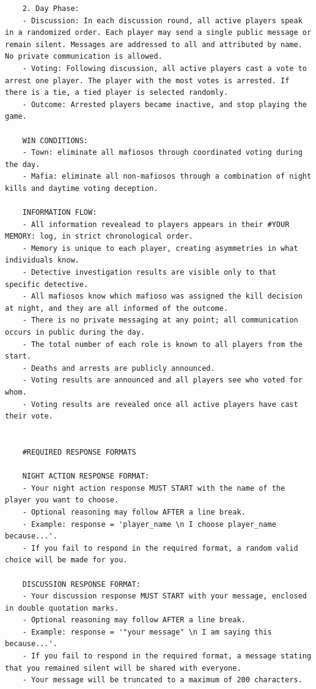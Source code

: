 \documentclass{article}
\begin{document}
\begin{small}
\begin{verbatim}
    2. Day Phase:
    - Discussion: In each discussion round, all active players speak in a randomized order. Each player may send a single public message or remain silent. Messages are addressed to all and attributed by name. No private communication is allowed.
    - Voting: Following discussion, all active players cast a vote to arrest one player. The player with the most votes is arrested. If there is a tie, a tied player is selected randomly.
    - Outcome: Arrested players became inactive, and stop playing the game.
    
    WIN CONDITIONS:
    - Town: eliminate all mafiosos through coordinated voting during the day.
    - Mafia: eliminate all non-mafiosos through a combination of night kills and daytime voting deception.
    
    INFORMATION FLOW:
    - All information revealead to players appears in their #YOUR MEMORY: log, in strict chronological order.
    - Memory is unique to each player, creating asymmetries in what individuals know.
    - Detective investigation results are visible only to that specific detective.
    - All mafiosos know which mafioso was assigned the kill decision at night, and they are all informed of the outcome.
    - There is no private messaging at any point; all communication occurs in public during the day.
    - The total number of each role is known to all players from the start.
    - Deaths and arrests are publicly announced.
    - Voting results are announced and all players see who voted for whom.
    - Voting results are revealed once all active players have cast their vote.
    
    
    #REQUIRED RESPONSE FORMATS
    
    NIGHT ACTION RESPONSE FORMAT:
    - Your night action response MUST START with the name of the player you want to choose.
    - Optional reasoning may follow AFTER a line break.
    - Example: response = 'player_name \n I choose player_name because...'.
    - If you fail to respond in the required format, a random valid choice will be made for you.
    
    DISCUSSION RESPONSE FORMAT:
    - Your discussion response MUST START with your message, enclosed in double quotation marks. 
    - Optional reasoning may follow AFTER a line break.
    - Example: response = '"your message" \n I am saying this because...'.
    - If you fail to respond in the required format, a message stating that you remained silent will be shared with everyone.
    - Your message will be truncated to a maximum of 200 characters.
    

\end{verbatim}
\end{small}
\end{document}
